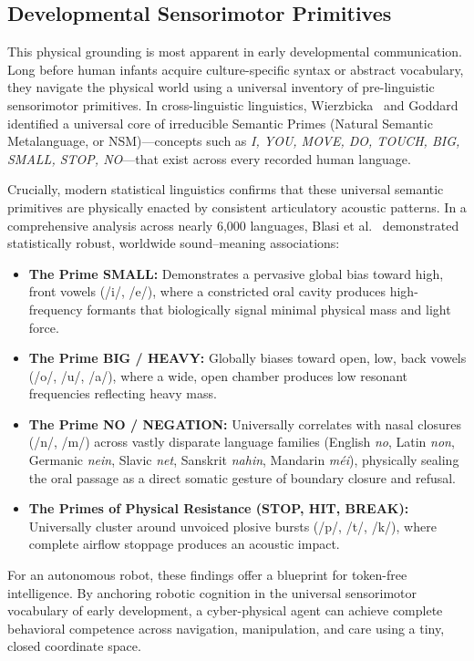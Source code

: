 \documentclass[journal,twocolumn]{IEEEtran}
\begin{document}
\subsection{Developmental Sensorimotor Primitives}
This physical grounding is most apparent in early developmental communication. Long before human infants acquire culture-specific syntax or abstract vocabulary, they navigate the physical world using a universal inventory of pre-linguistic sensorimotor primitives. In cross-linguistic linguistics, Wierzbicka~\cite{wierzbicka1996} and Goddard~\cite{goddard2002} identified a universal core of irreducible Semantic Primes (Natural Semantic Metalanguage, or NSM)---concepts such as \emph{I, YOU, MOVE, DO, TOUCH, BIG, SMALL, STOP, NO}---that exist across every recorded human language.

Crucially, modern statistical linguistics confirms that these universal semantic primitives are physically enacted by consistent articulatory acoustic patterns. In a comprehensive analysis across nearly 6,000 languages, Blasi et al.~\cite{blasi2016} demonstrated statistically robust, worldwide sound--meaning associations:
\begin{itemize}
    \item \textbf{The Prime SMALL:} Demonstrates a pervasive global bias toward high, front vowels (/i/, /e/), where a constricted oral cavity produces high-frequency formants that biologically signal minimal physical mass and light force.
    \item \textbf{The Prime BIG / HEAVY:} Globally biases toward open, low, back vowels (/o/, /u/, /a/), where a wide, open chamber produces low resonant frequencies reflecting heavy mass.
    \item \textbf{The Prime NO / NEGATION:} Universally correlates with nasal closures (/n/, /m/) across vastly disparate language families (English \emph{no}, Latin \emph{non}, Germanic \emph{nein}, Slavic \emph{net}, Sanskrit \emph{nahin}, Mandarin \emph{m\'ei}), physically sealing the oral passage as a direct somatic gesture of boundary closure and refusal.
    \item \textbf{The Primes of Physical Resistance (STOP, HIT, BREAK):} Universally cluster around unvoiced plosive bursts (/p/, /t/, /k/), where complete airflow stoppage produces an acoustic impact.
\end{itemize}

For an autonomous robot, these findings offer a blueprint for token-free intelligence. By anchoring robotic cognition in the universal sensorimotor vocabulary of early development, a cyber-physical agent can achieve complete behavioral competence across navigation, manipulation, and care using a tiny, closed coordinate space.
\end{document}
